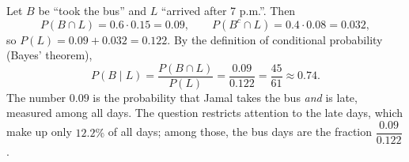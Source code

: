 Let $B$ be ``took the bus'' and $L$ ``arrived after 7 p.m.''. Then
\[P(B\cap L)=0.6\cdot0.15=0.09,\qquad P(B^c\cap L)=0.4\cdot0.08=0.032,\]
so $P(L)=0.09+0.032=0.122$. By the definition of conditional probability (Bayes' theorem),
\[P(B\mid L)=\dfrac{P(B\cap L)}{P(L)}=\dfrac{0.09}{0.122}=\boxed{\dfrac{45}{61}\approx0.74}.\]
The number $0.09$ is the probability that Jamal takes the bus \emph{and} is late, measured among all days. The question restricts attention to the late days, which make up only $12.2\%$ of all days; among those, the bus days are the fraction $\dfrac{0.09}{0.122}$.
